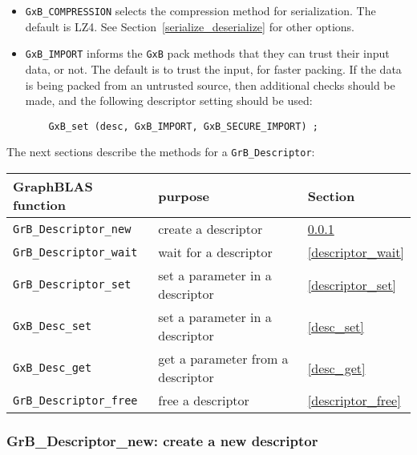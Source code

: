 \documentclass[12pt]{article}
\begin{document}
\begin{itemize}
\item \verb'GxB_COMPRESSION' selects the compression method for serialization.
    The default is LZ4.  See Section~\ref{serialize_deserialize} for other
    options.

\item \verb'GxB_IMPORT' informs the \verb'GxB' pack methods
    that they can trust their input data, or not.  The default is to trust
    the input, for faster packing.  If the data is being packed from an
    untrusted source, then additional checks should be made, and the 
    following descriptor setting should be used:

    {\footnotesize
    \begin{verbatim}
    GxB_set (desc, GxB_IMPORT, GxB_SECURE_IMPORT) ; \end{verbatim}}

\end{itemize}

The next sections describe the methods for a \verb'GrB_Descriptor':

\vspace{0.2in}
{\footnotesize
\begin{tabular}{lll}
GraphBLAS function   & purpose                                      & Section \\
\hline
\verb'GrB_Descriptor_new'        & create a descriptor                  & \ref{descriptor_new} \\
\verb'GrB_Descriptor_wait'       & wait for a descriptor                & \ref{descriptor_wait} \\
\verb'GrB_Descriptor_set'        & set a parameter in a descriptor      & \ref{descriptor_set} \\
\verb'GxB_Desc_set'              & set a parameter in a descriptor      & \ref{desc_set}  \\
\verb'GxB_Desc_get'              & get a parameter from a descriptor    & \ref{desc_get}  \\
\verb'GrB_Descriptor_free'       & free a descriptor                    & \ref{descriptor_free} \\
\hline
\end{tabular}
}

\newpage
\subsubsection{{\sf GrB\_Descriptor\_new:}  create a new descriptor}
\label{descriptor_new}
\end{document}
